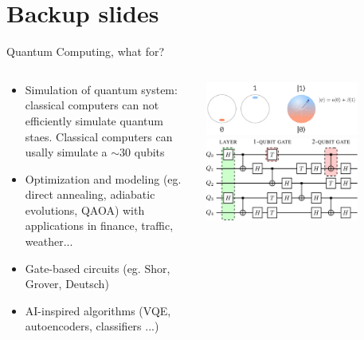 \documentclass[aspectratio=169,10pt]{beamer}
\newcounter{mainframenumber}
\newcommand{\backupbegin}{
  \setcounter{mainframenumber}{\value{framenumber}}
}
\begin{document}

\backupbegin
\appendix


\section*{Backup slides}

\begin{frame}{Quantum Computing, what for?}
  \begin{columns}
    \begin{column}{0.5\textwidth}
      \begin{itemize}[label=\textbullet]
        \small
        \item<2-> Simulation of quantum system: classical computers can not efficiently simulate quantum staes. Classical computers can usally simulate a $\sim 30$ qubits  
        \item<3-> Optimization and modeling (eg. direct annealing, adiabatic evolutions, QAOA) with applications in finance, traffic, weather... 
        \item<4-> Gate-based circuits (eg. Shor, Grover, Deutsch)
        \item<5-> AI-inspired algorithms (VQE, autoencoders, classifiers ...)
      \end{itemize}
      \end{column}
      \begin{column}{0.5\textwidth}
        \begin{center}
            \includegraphics[width=0.75\textwidth]{figures/BlochSphere.png}\\
            \vspace*{1.75em}
            \includegraphics[width=0.75\textwidth]{figures/circuit.png}\\
        \end{center}
      \end{column}
  \end{columns}
\end{frame}
\end{document}
